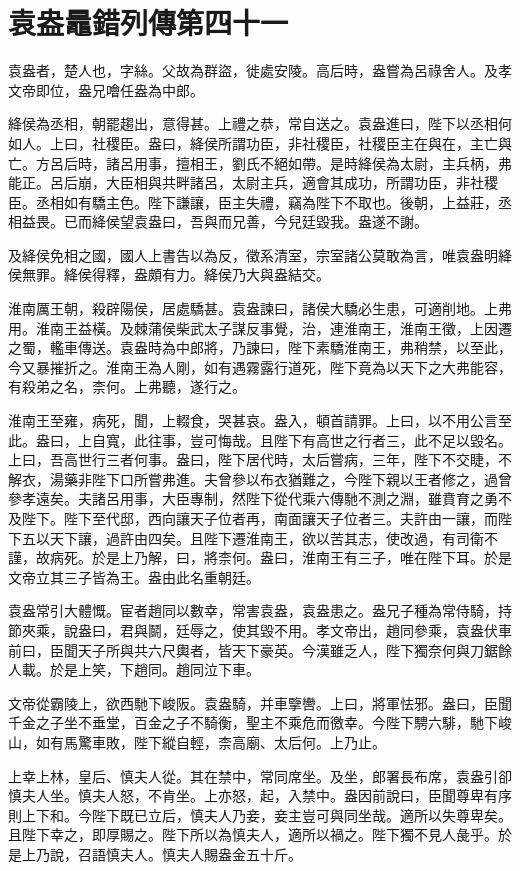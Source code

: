 \chapter{袁盎鼂錯列傳第四十一}

袁盎者，楚人也，字絲。父故為群盜，徙處安陵。高后時，盎嘗為呂祿舍人。及孝文帝即位，盎兄噲任盎為中郎。

絳侯為丞相，朝罷趨出，意得甚。上禮之恭，常自送之。袁盎進曰，陛下以丞相何如人。上曰，社稷臣。盎曰，絳侯所謂功臣，非社稷臣，社稷臣主在與在，主亡與亡。方呂后時，諸呂用事，擅相王，劉氏不絕如帶。是時絳侯為太尉，主兵柄，弗能正。呂后崩，大臣相與共畔諸呂，太尉主兵，適會其成功，所謂功臣，非社稷臣。丞相如有驕主色。陛下謙讓，臣主失禮，竊為陛下不取也。後朝，上益莊，丞相益畏。已而絳侯望袁盎曰，吾與而兄善，今兒廷毀我。盎遂不謝。

及絳侯免相之國，國人上書告以為反，徵系清室，宗室諸公莫敢為言，唯袁盎明絳侯無罪。絳侯得釋，盎頗有力。絳侯乃大與盎結交。

淮南厲王朝，殺辟陽侯，居處驕甚。袁盎諫曰，諸侯大驕必生患，可適削地。上弗用。淮南王益橫。及棘蒲侯柴武太子謀反事覺，治，連淮南王，淮南王徵，上因遷之蜀，轞車傳送。袁盎時為中郎將，乃諫曰，陛下素驕淮南王，弗稍禁，以至此，今又暴摧折之。淮南王為人剛，如有遇霧露行道死，陛下竟為以天下之大弗能容，有殺弟之名，柰何。上弗聽，遂行之。

淮南王至雍，病死，聞，上輟食，哭甚哀。盎入，頓首請罪。上曰，以不用公言至此。盎曰，上自寬，此往事，豈可悔哉。且陛下有高世之行者三，此不足以毀名。上曰，吾高世行三者何事。盎曰，陛下居代時，太后嘗病，三年，陛下不交睫，不解衣，湯藥非陛下口所嘗弗進。夫曾參以布衣猶難之，今陛下親以王者修之，過曾參孝遠矣。夫諸呂用事，大臣專制，然陛下從代乘六傳馳不測之淵，雖賁育之勇不及陛下。陛下至代邸，西向讓天子位者再，南面讓天子位者三。夫許由一讓，而陛下五以天下讓，過許由四矣。且陛下遷淮南王，欲以苦其志，使改過，有司衛不謹，故病死。於是上乃解，曰，將柰何。盎曰，淮南王有三子，唯在陛下耳。於是文帝立其三子皆為王。盎由此名重朝廷。

袁盎常引大體慨。宦者趙同以數幸，常害袁盎，袁盎患之。盎兄子種為常侍騎，持節夾乘，說盎曰，君與鬬，廷辱之，使其毀不用。孝文帝出，趙同參乘，袁盎伏車前曰，臣聞天子所與共六尺輿者，皆天下豪英。今漢雖乏人，陛下獨奈何與刀鋸餘人載。於是上笑，下趙同。趙同泣下車。

文帝從霸陵上，欲西馳下峻阪。袁盎騎，并車擥轡。上曰，將軍怯邪。盎曰，臣聞千金之子坐不垂堂，百金之子不騎衡，聖主不乘危而徼幸。今陛下騁六騑，馳下峻山，如有馬驚車敗，陛下縱自輕，柰高廟、太后何。上乃止。

上幸上林，皇后、慎夫人從。其在禁中，常同席坐。及坐，郎署長布席，袁盎引卻慎夫人坐。慎夫人怒，不肯坐。上亦怒，起，入禁中。盎因前說曰，臣聞尊卑有序則上下和。今陛下既已立后，慎夫人乃妾，妾主豈可與同坐哉。適所以失尊卑矣。且陛下幸之，即厚賜之。陛下所以為慎夫人，適所以禍之。陛下獨不見人彘乎。於是上乃說，召語慎夫人。慎夫人賜盎金五十斤。

